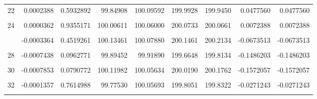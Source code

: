 \documentclass[a4paper]{tufte-handout}
\begin{document}
\begin{table}
{\begin{tabular}[t]{rrrrrrrrr}
22 & 0.0002388 & 0.5932892 & 99.84908 & 100.09592 & 199.9928 & 199.9450 & 0.0477560 & 0.0477560\\
\cellcolor{gray!6}{23} & \cellcolor{gray!6}{-0.0000588} & \cellcolor{gray!6}{0.8953510} & \cellcolor{gray!6}{100.04059} & \cellcolor{gray!6}{99.88865} & \cellcolor{gray!6}{199.9175} & \cellcolor{gray!6}{199.9292} & \cellcolor{gray!6}{-0.0117608} & \cellcolor{gray!6}{-0.0117608}\\
24 & 0.0000362 & 0.9355171 & 100.00611 & 100.06000 & 200.0733 & 200.0661 & 0.0072388 & 0.0072388\\
\cellcolor{gray!6}{25} & \cellcolor{gray!6}{-0.0001666} & \cellcolor{gray!6}{0.7094174} & \cellcolor{gray!6}{99.86403} & \cellcolor{gray!6}{99.87116} & \cellcolor{gray!6}{199.7019} & \cellcolor{gray!6}{199.7352} & \cellcolor{gray!6}{-0.0332857} & \cellcolor{gray!6}{-0.0332857}\\
\addlinespace
26 & -0.0003364 & 0.4519261 & 100.13461 & 100.07880 & 200.1461 & 200.2134 & -0.0673513 & -0.0673513\\
\cellcolor{gray!6}{27} & \cellcolor{gray!6}{-0.0002519} & \cellcolor{gray!6}{0.5732147} & \cellcolor{gray!6}{99.97644} & \cellcolor{gray!6}{99.88570} & \cellcolor{gray!6}{199.8118} & \cellcolor{gray!6}{199.8621} & \cellcolor{gray!6}{-0.0503505} & \cellcolor{gray!6}{-0.0503505}\\
28 & -0.0007438 & 0.0962771 & 99.89452 & 99.91890 & 199.6648 & 199.8134 & -0.1486203 & -0.1486203\\
\cellcolor{gray!6}{29} & \cellcolor{gray!6}{-0.0001734} & \cellcolor{gray!6}{0.6982670} & \cellcolor{gray!6}{99.88154} & \cellcolor{gray!6}{100.02434} & \cellcolor{gray!6}{199.8712} & \cellcolor{gray!6}{199.9059} & \cellcolor{gray!6}{-0.0346571} & \cellcolor{gray!6}{-0.0346571}\\
30 & -0.0007853 & 0.0790772 & 100.11982 & 100.05634 & 200.0190 & 200.1762 & -0.1572057 & -0.1572057\\
\addlinespace
\cellcolor{gray!6}{31} & \cellcolor{gray!6}{-0.0000707} & \cellcolor{gray!6}{0.8743035} & \cellcolor{gray!6}{100.13424} & \cellcolor{gray!6}{99.86444} & \cellcolor{gray!6}{199.9845} & \cellcolor{gray!6}{199.9987} & \cellcolor{gray!6}{-0.0141492} & \cellcolor{gray!6}{-0.0141492}\\
32 & -0.0001357 & 0.7614988 & 99.77530 & 100.05693 & 199.8051 & 199.8322 & -0.0271243 & -0.0271243\\
\cellcolor{gray!6}{33} & \cellcolor{gray!6}{-0.0001069} & \cellcolor{gray!6}{0.8111459} & \cellcolor{gray!6}{99.95227} & \cellcolor{gray!6}{99.84470} & \cellcolor{gray!6}{199.7756} & \cellcolor{gray!6}{199.7970} & \cellcolor{gray!6}{-0.0213505} & \cellcolor{gray!6}{-0.0213505}\\

\end{tabular}}
\end{table}
\end{document}

